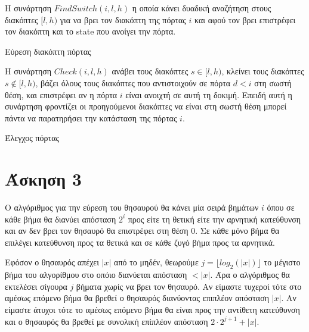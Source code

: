 Η συνάρτηση $FindSwitch(i, l, h)$ η οποία κάνει δυαδική αναζήτηση στους
διακόπτες $[l, h)$ για να βρει τον διακόπτη της πόρτας $i$ και αφού τον βρει
επιστρέφει τον διακόπτη και το state που ανοίγει την πόρτα.

\begin{algorithm}[H]
  \caption{\label{alg:ex2-findswitch}Εύρεση διακόπτη πόρτας}
    \begin{algorithmic}[1]
          \State{}
        \Else
            \State{}
          \Else
            \State{}
          \EndIf
        \EndIf
      \EndFunction
    \end{algorithmic}
\end{algorithm}

Η συνάρτηση $Check(i, l, h)$ ανάβει τους διακόπτες $s \in [l, h)$, κλείνει τους
διακόπτες $s \notin [l, h)$, βάζει όλους τους διακόπτες που αντιστοιχούν σε
πόρτα $d < i$ στη σωστή θέση, και επιστρέφει αν η πόρτα $i$ είναι ανοιχτή σε
αυτή τη δοκιμή. Επειδή αυτή η συνάρτηση φροντίζει οι προηγούμενοι διακόπτες να
είναι στη σωστή θέση μπορεί πάντα να παρατηρήσει την κατάσταση της πόρτας $i$.

\begin{algorithm}[H]
  \caption{\label{alg:ex2-findswitch}Έλεγχος πόρτας}
    \begin{algorithmic}[1]
        \State{}
      \EndFunction
    \end{algorithmic}
\end{algorithm}

\section{Άσκηση 3}

Ο αλγόριθμος για την εύρεση του θησαυρού θα κάνει μία σειρά βημάτων $i$ όπου σε
κάθε βήμα θα διανύει απόσταση $2^{i}$ προς είτε τη θετική είτε την αρνητική
κατεύθυνση και αν δεν βρει τον θησαυρό θα επιστρέφει στη θέση $0$. Σε κάθε μόνο
βήμα θα επιλέγει κατεύθυνση προς τα θετικά και σε κάθε ζυγό βήμα προς τα
αρνητικά.

Εφόσον ο θησαυρός απέχει $|x|$ από το μηδέν, θεωρούμε $j = \lfloor
log_{2}(|x|) \rfloor$ το μέγιστο βήμα του αλγορίθμου στο οπόιο διανύεται
απόσταση $< |x|$. Άρα ο αλγόριθμος θα εκτελέσει σίγουρα $j$ βήματα
χωρίς να βρει τον θησαυρό. Αν είμαστε τυχεροί τότε στο αμέσως επόμενο βήμα θα
βρεθεί ο θησαυρός διανύοντας επιπλέον απόσταση $|x|$. Αν είμαστε άτυχοι τότε το
αμέσως επόμενο βήμα θα είναι προς την αντίθετη κατεύθυνση και ο θησαυρός θα
βρεθεί με συνολική επίπλέον απόσταση $2 \cdot 2^{j + 1} + |x|$.

